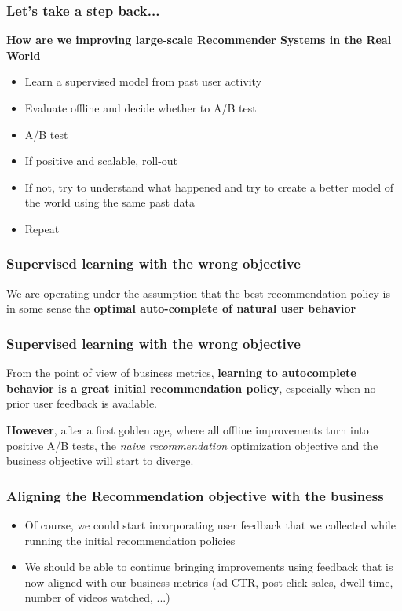 \begin{frame}
  \frametitle{Let's take a step back...}
  
  \textbf{How are we improving large-scale Recommender Systems in the Real World}
  
  \begin{itemize}
  \item Learn a supervised model from past user activity
  \item Evaluate offline and decide whether to A/B test
  \item A/B test
  \item If positive and scalable, roll-out
  \item If not, try to understand what happened and try to create a better model of the world using the same past data
  \item Repeat
  \end{itemize}
        
  \end{frame}
  

  
  \begin{frame}
    \frametitle{Supervised learning with the wrong objective}
  
  We are operating under the assumption that the best recommendation policy is in some sense the \textbf{optimal auto-complete of natural user behavior}
  
  \end{frame}
  
  
  \begin{frame}
    \frametitle{Supervised learning with the wrong objective}
  
  From the point of view of business metrics, \textbf{learning to autocomplete behavior is a great initial recommendation policy}, especially when no prior user feedback is available. 
  
  \pause
  \textbf{However}, after a first golden age, where all offline improvements turn into positive A/B tests, the \emph{naive recommendation} optimization objective and the business objective will start to diverge.
  
  \end{frame}
  
  
  \begin{frame}
    \frametitle{Aligning the Recommendation objective with the business}
  
  \begin{itemize}
  \item Of course, we could start incorporating user feedback that we collected while running the initial recommendation policies  
  \item We should be able to continue bringing improvements using feedback that is now aligned with our business metrics (ad CTR, post click sales, dwell time, number of videos watched, ...)
  \end{itemize}
  
  \end{frame}
  

